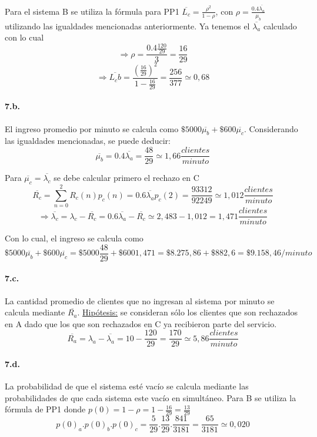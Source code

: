 \documentclass{article}
\begin{document}
  Para el sistema B se utiliza la fórmula para PP1 $\overline{L_c} = \frac{\rho^2}{1-\rho}$, con $\rho = \frac{0.4\overline{\lambda_a}}{\mu_b}$ utilizando las igualdades mencionadas anteriormente. Ya tenemos el $\overline{\lambda_a}$ calculado con lo cual \\
  $$\Rightarrow \rho = \frac{0.4\frac{120}{29}}{3} = \frac{16}{29} $$
  $$\Rightarrow \overline{L_cb} = \frac{(\frac{16}{29})^2}{1-\frac{16}{29}} = \frac{256}{377} \simeq 0,68 $$
  
  \paragraph{7.b.} El ingreso promedio por minuto se calcula como $\$5000 \overline{\mu_b} + \$600 \overline{\mu_c} $. Considerando las igualdades mencionadas, se puede deducir:
  $$ \overline{\mu_b} = 0.4\overline{\lambda_a} = \frac{48}{29} \simeq 1,66 \frac{clientes}{minuto}$$ 
  
  Para $\overline{\mu_c} = \overline{\lambda_c}$ se debe calcular primero el rechazo en C
  $$ \overline{R_c} = \sum_{n=0}^{2} R_c(n) p_c(n) = 0.6 \overline{\lambda_a} p_c(2) =  \frac{93312}{92249} \simeq 1,012 \frac{clientes}{minuto}$$
  $$\Rightarrow \overline{\lambda_c} = \lambda_c -\overline{R_c} = 0.6\overline{\lambda_a} -\overline{R_c} \simeq 2,483 - 1,012 = 1,471 \frac{clientes}{minuto}$$
  
  Con lo cual, el ingreso se calcula como
  $$\$5000 \overline{\mu_b} + \$600 \overline{\mu_c} = \$5000 \frac{48}{29} + \$600 1,471 = \$8.275,86 + \$882,6 = \$9.158,46 / minuto$$
  
  \paragraph{7.c.} La cantidad promedio de clientes que no ingresan al sistema por minuto se calcula mediante $\overline{R_a}$. 
  \underline{Hipótesis:} se consideran sólo los clientes que son rechazados en A dado que los que son rechazados en C ya recibieron parte del servicio.
  $$\overline{R_a} = \lambda_a -\overline{\lambda_a} = 10 - \frac{120}{29} = \frac{170}{29} \simeq 5,86 \frac{clientes}{minuto}$$
  
  \paragraph{7.d.} La probabilidad de que el sistema esté vacío se calcula mediante las probabilidades de que cada sistema este vacío en simultáneo. 
  Para B se utiliza la fórmula de PP1 donde $p(0) = 1-\rho = 1- \frac{16}{29} = \frac{13}{29} $
  $$ p(0)_a . p(0)_b . p(0)_c = \frac{5}{29} .\frac{13}{29} . \frac{841}{3181} = \frac{65}{3181} \simeq 0,020 $$
\end{document}
